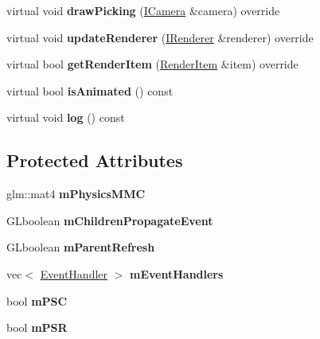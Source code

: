 \begin{DoxyCompactItemize}
virtual void {\bfseries draw\+Picking} (\hyperlink{classflw_1_1flf_1_1ICamera}{I\+Camera} \&camera) override
\item 
\mbox{\label{classflw_1_1flf_1_1Entity_a469575479f34a7113331126bd6baee8f}} 
virtual void {\bfseries update\+Renderer} (\hyperlink{classflw_1_1flf_1_1IRenderer}{I\+Renderer} \&renderer) override
\item 
\mbox{\label{classflw_1_1flf_1_1Entity_a401249745279bc6c62814a50a9ce3ee9}} 
virtual bool {\bfseries get\+Render\+Item} (\hyperlink{structflw_1_1flf_1_1RenderItem}{Render\+Item} \&item) override
\item 
\mbox{\label{classflw_1_1flf_1_1Entity_a658c8f24fda161d1f012f54648161df0}} 
virtual bool {\bfseries is\+Animated} () const
\item 
\mbox{\label{classflw_1_1flf_1_1Entity_aef949c65d427cb8c863b6a5c767fc81b}} 
virtual void {\bfseries log} () const
\end{DoxyCompactItemize}
\subsection*{Protected Attributes}
\begin{DoxyCompactItemize}
\item 
\mbox{\label{classflw_1_1flf_1_1Entity_aef9e641dc79bc9dccca0ce13e618ce68}} 
glm\+::mat4 {\bfseries m\+Physics\+M\+MC}
\item 
\mbox{\label{classflw_1_1flf_1_1Entity_a4a1f8bd96ef1ab91cbcfd146497b7fc3}} 
G\+Lboolean {\bfseries m\+Children\+Propagate\+Event}
\item 
\mbox{\label{classflw_1_1flf_1_1Entity_aabd5eef30310557a0c7e4d2dbde8b8b1}} 
G\+Lboolean {\bfseries m\+Parent\+Refresh}
\item 
\mbox{\label{classflw_1_1flf_1_1Entity_a3026400665f34a6e9b80a24065499bfe}} 
vec$<$ \hyperlink{classflw_1_1flf_1_1EventHandler}{Event\+Handler} $>$ {\bfseries m\+Event\+Handlers}
\item 
\mbox{\label{classflw_1_1flf_1_1Entity_a62bcdd22a2296938835b75e437ac44de}} 
bool {\bfseries m\+P\+SC}
\item 
\mbox{\label{classflw_1_1flf_1_1Entity_a3cf49c34a89762d1fe000a31ec5b2f30}} 
bool {\bfseries m\+P\+SR}
\end{DoxyCompactItemize}
